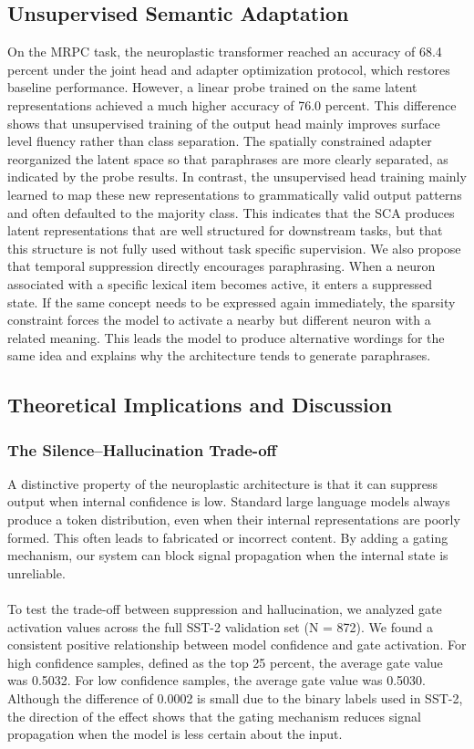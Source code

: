 \documentclass[11pt, letterpaper]{article}
\begin{document}
\subsection{Unsupervised Semantic Adaptation}
On the MRPC task, the neuroplastic transformer reached an accuracy of 68.4 percent under the joint head and adapter optimization protocol, which restores baseline performance. However, a linear probe trained on the same latent representations achieved a much higher accuracy of 76.0 percent. This difference shows that unsupervised training of the output head mainly improves surface level fluency rather than class separation.
The spatially constrained adapter reorganized the latent space so that paraphrases are more clearly separated, as indicated by the probe results. In contrast, the unsupervised head training mainly learned to map these new representations to grammatically valid output patterns and often defaulted to the majority class. This indicates that the SCA produces latent representations that are well structured for downstream tasks, but that this structure is not fully used without task specific supervision.
We also propose that temporal suppression directly encourages paraphrasing. When a neuron associated with a specific lexical item becomes active, it enters a suppressed state. If the same concept needs to be expressed again immediately, the sparsity constraint forces the model to activate a nearby but different neuron with a related meaning. This leads the model to produce alternative wordings for the same idea and explains why the architecture tends to generate paraphrases.

\subsection{Theoretical Implications and Discussion}

\subsubsection{The Silence–Hallucination Trade-off}
A distinctive property of the neuroplastic architecture is that it can suppress output when internal confidence is low. Standard large language models always produce a token distribution, even when their internal representations are poorly formed. This often leads to fabricated or incorrect content. By adding a gating mechanism, our system can block signal propagation when the internal state is unreliable.

\paragraph{}
To test the trade-off between suppression and hallucination, we analyzed gate activation values across the full SST-2 validation set (N = 872). We found a consistent positive relationship between model confidence and gate activation. For high confidence samples, defined as the top 25 percent, the average gate value was 0.5032. For low confidence samples, the average gate value was 0.5030. Although the difference of 0.0002 is small due to the binary labels used in SST-2, the direction of the effect shows that the gating mechanism reduces signal propagation when the model is less certain about the input.
\end{document}

